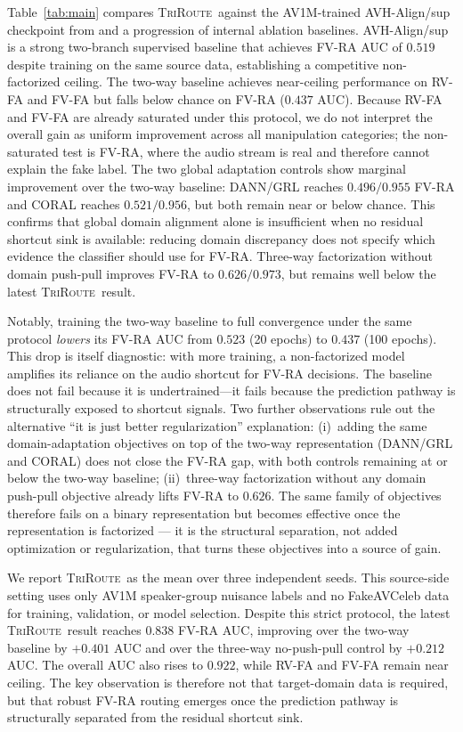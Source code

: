 \documentclass{article}
\newcommand{\method}{\textsc{TriRoute}}
\begin{document}
Table~\ref{tab:main} compares \method\ against the AV1M-trained AVH-Align/sup checkpoint from \citet{smeu2025avhalign} and a progression of internal ablation baselines. AVH-Align/sup is a strong two-branch supervised baseline that achieves FV-RA AUC of $0.519$ despite training on the same source data, establishing a competitive non-factorized ceiling. The two-way baseline achieves near-ceiling performance on RV-FA and FV-FA but falls below chance on FV-RA ($0.437$ AUC). Because RV-FA and FV-FA are already saturated under this protocol, we do not interpret the overall gain as uniform improvement across all manipulation categories; the non-saturated test is FV-RA, where the audio stream is real and therefore cannot explain the fake label. The two global adaptation controls show marginal improvement over the two-way baseline: DANN/GRL reaches $0.496/0.955$ FV-RA and CORAL reaches $0.521/0.956$, but both remain near or below chance. This confirms that global domain alignment alone is insufficient when no residual shortcut sink is available: reducing domain discrepancy does not specify which evidence the classifier should use for FV-RA. Three-way factorization without domain push-pull improves FV-RA to $0.626/0.973$, but remains well below the latest \method\ result.

Notably, training the two-way baseline to full convergence under the same protocol \emph{lowers} its FV-RA AUC from $0.523$ (20 epochs) to $0.437$ (100 epochs). This drop is itself diagnostic: with more training, a non-factorized model amplifies its reliance on the audio shortcut for FV-RA decisions. The baseline does not fail because it is undertrained---it fails because the prediction pathway is structurally exposed to shortcut signals. Two further observations rule out the alternative ``it is just better regularization'' explanation: (i)~adding the same domain-adaptation objectives on top of the two-way representation (DANN/GRL and CORAL) does not close the FV-RA gap, with both controls remaining at or below the two-way baseline; (ii)~three-way factorization without any domain push-pull objective already lifts FV-RA to $0.626$. The same family of objectives therefore fails on a binary representation but becomes effective once the representation is factorized --- it is the structural separation, not added optimization or regularization, that turns these objectives into a source of gain.

We report \method\ as the mean over three independent seeds. This source-side setting uses only AV1M speaker-group nuisance labels and no FakeAVCeleb data for training, validation, or model selection. Despite this strict protocol, the latest \method\ result reaches $0.838$ FV-RA AUC, improving over the two-way baseline by $+0.401$ AUC and over the three-way no-push-pull control by $+0.212$ AUC. The overall AUC also rises to $0.922$, while RV-FA and FV-FA remain near ceiling. The key observation is therefore not that target-domain data is required, but that robust FV-RA routing emerges once the prediction pathway is structurally separated from the residual shortcut sink.
\end{document}
